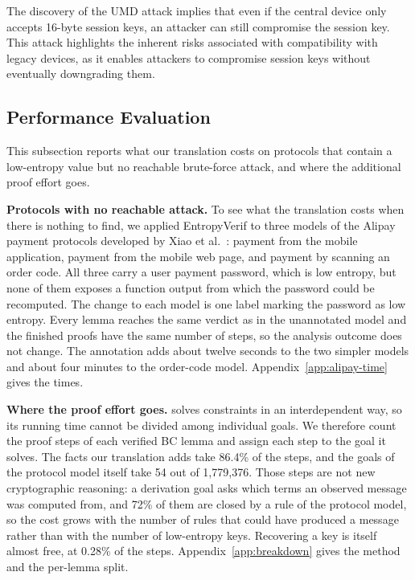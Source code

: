 The discovery of the UMD attack implies that even if the central device only accepts 16-byte session keys, an attacker can still compromise the session key.
This attack highlights the inherent risks associated with compatibility with legacy devices, as it enables attackers to compromise session keys without eventually downgrading them.

\subsection{Performance Evaluation} \label{sec:performance}

This subsection reports what our translation costs on protocols that contain a low-entropy value
but no reachable brute-force attack, and where the additional proof effort goes.

\noindent\textbf{Protocols with no reachable attack.}
To see what the translation costs when there is nothing to find, we applied EntropyVerif to three
models of the Alipay payment protocols developed by Xiao et al.~\cite{xiao2026payment}: payment
from the mobile application, payment from the mobile web page, and payment by scanning an order
code.
All three carry a user payment password, which is low entropy, but none of them exposes a function
output from which the password could be recomputed.
The change to each model is one label marking the password as low entropy.
Every lemma reaches the same verdict as in the unannotated model and the finished proofs have the
same number of steps, so the analysis outcome does not change. The annotation adds about twelve
seconds to the two simpler models and about four minutes to the order-code model.
Appendix~\ref{app:alipay-time} gives the times.

\noindent\textbf{Where the proof effort goes.}
\Tamarin{} solves constraints in an interdependent way, so its running time cannot be divided
among individual goals. We therefore count the proof steps of each verified BC lemma and assign
each step to the goal it solves. The facts our translation adds take 86.4\% of the steps, and the
goals of the protocol model itself take 54 out of 1{,}779{,}376. Those steps are not new
cryptographic reasoning: a derivation goal asks which terms an observed message was computed from,
and 72\% of them are closed by a rule of the protocol model, so the cost grows with the number of
rules that could have produced a message rather than with the number of low-entropy keys.
Recovering a key is itself almost free, at 0.28\% of the steps. Appendix~\ref{app:breakdown} gives the
method and the per-lemma split.

